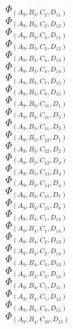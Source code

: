 \documentclass[14pt]{article}
\begin{document}
    $\Phi_{({A}_{9}, {B}_{3}, {C}_{2}, {D}_{11})}$ \\ 
    $\Phi_{({A}_{9}, {B}_{3}, {C}_{2}, {D}_{12})}$ \\ 
    $\Phi_{({A}_{9}, {B}_{3}, {C}_{3}, {D}_{11})}$ \\ 
    $\Phi_{({A}_{9}, {B}_{3}, {C}_{3}, {D}_{12})}$ \\ 
    $\Phi_{({A}_{9}, {B}_{3}, {C}_{4}, {D}_{13})}$ \\ 
    $\Phi_{({A}_{9}, {B}_{3}, {C}_{4}, {D}_{14})}$ \\ 
    $\Phi_{({A}_{9}, {B}_{3}, {C}_{7}, {D}_{15})}$ \\ 
    $\Phi_{({A}_{9}, {B}_{3}, {C}_{8}, {D}_{15})}$ \\ 
    $\Phi_{({A}_{9}, {B}_{3}, {C}_{11}, {D}_{1})}$ \\ 
    $\Phi_{({A}_{9}, {B}_{3}, {C}_{11}, {D}_{2})}$ \\ 
    $\Phi_{({A}_{9}, {B}_{3}, {C}_{11}, {D}_{3})}$ \\ 
    $\Phi_{({A}_{9}, {B}_{3}, {C}_{12}, {D}_{1})}$ \\ 
    $\Phi_{({A}_{9}, {B}_{3}, {C}_{12}, {D}_{2})}$ \\ 
    $\Phi_{({A}_{9}, {B}_{3}, {C}_{12}, {D}_{3})}$ \\ 
    $\Phi_{({A}_{9}, {B}_{3}, {C}_{13}, {D}_{4})}$ \\ 
    $\Phi_{({A}_{9}, {B}_{3}, {C}_{14}, {D}_{4})}$ \\ 
    $\Phi_{({A}_{9}, {B}_{3}, {C}_{15}, {D}_{7})}$ \\ 
    $\Phi_{({A}_{9}, {B}_{3}, {C}_{15}, {D}_{8})}$ \\ 
    $\Phi_{({A}_{9}, {B}_{4}, {C}_{1}, {D}_{13})}$ \\ 
    $\Phi_{({A}_{9}, {B}_{4}, {C}_{1}, {D}_{14})}$ \\ 
    $\Phi_{({A}_{9}, {B}_{4}, {C}_{2}, {D}_{13})}$ \\ 
    $\Phi_{({A}_{9}, {B}_{4}, {C}_{2}, {D}_{14})}$ \\ 
    $\Phi_{({A}_{9}, {B}_{4}, {C}_{3}, {D}_{13})}$ \\ 
    $\Phi_{({A}_{9}, {B}_{4}, {C}_{3}, {D}_{14})}$ \\ 
    $\Phi_{({A}_{9}, {B}_{4}, {C}_{5}, {D}_{11})}$ \\ 
    $\Phi_{({A}_{9}, {B}_{4}, {C}_{5}, {D}_{12})}$ \\ 
    $\Phi_{({A}_{9}, {B}_{4}, {C}_{9}, {D}_{15})}$ \\ 
    $\Phi_{({A}_{9}, {B}_{4}, {C}_{10}, {D}_{15})}$ \\ 
\end{document}

